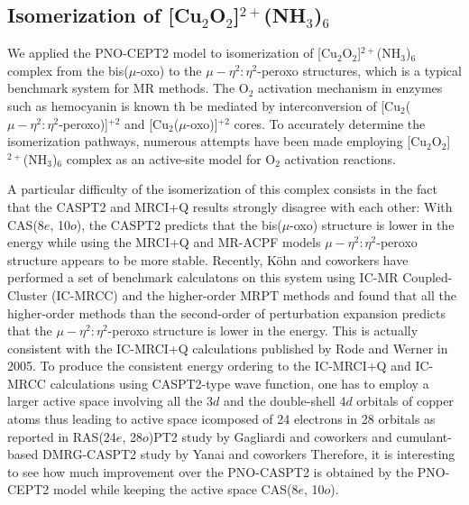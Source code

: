 \documentclass[aip,jcp,amsmath,twocolumn,floatfix,reprint,fleqn]{revtex4-1}
\begin{document}
\subsection{Isomerization of [Cu${}_2$O${}_2$]${}^{2+}$(NH${}_3$)${}_{6}$}

%
We applied the PNO-CEPT2 model to isomerization of [Cu${}_2$O${}_2$]${}^{2+}$(NH${}_3$)${}_{6}$ complex from the bis($\mu$-oxo) to the $\mu-\eta^2:\eta^2$-peroxo structures, which is a typical benchmark system for MR methods.\cite{Rode2005,AK74,doi:10.1063/1.4900878}
%
The O${}_2$ activation mechanism in enzymes such as hemocyanin is known th be mediated by interconversion of [Cu${}_2$($\mu-\eta^2:\eta^2$-peroxo)]${}^{+2}$ and [Cu${}_2$($\mu$-oxo)]${}^{+2}$ cores.
%
To accurately determine the isomerization pathways, numerous attempts have been made employing [Cu${}_2$O${}_2$]${}^{2+}$(NH${}_3$)${}_{6}$ complex as an active-site model for O${}_2$ activation reactions.

%
A particular difficulty of the isomerization of this complex consists in the fact that the CASPT2 and MRCI+Q results strongly disagree with each other: With CAS(8$e$, 10$o$), the CASPT2 predicts that the bis($\mu$-oxo) structure is lower in the energy while using the MRCI+Q and MR-ACPF models $\mu-\eta^2:\eta^2$-peroxo structure appears to be more stable.
%
Recently, K\"ohn and coworkers\cite{AK74} have performed a set of benchmark calculatons on this system using IC-MR Coupled-Cluster (IC-MRCC)\cite{MHandKoehn2011,hanauercommunication:2012} and the higher-order MRPT methods and found that all the higher-order methods than the second-order of perturbation expansion predicts that the $\mu-\eta^2:\eta^2$-peroxo structure is lower in the energy.
%
This is actually consistent with the IC-MRCI+Q calculations published by Rode and Werner in 2005.\cite{Rode2005}
%
To produce the consistent energy ordering to the IC-MRCI+Q and IC-MRCC calculations using CASPT2-type wave function, one has to employ a larger active space involving all the 3$d$ and the double-shell 4$d$ orbitals of copper atoms thus leading to active space icomposed of 24 electrons in 28 orbitals as reported in RAS(24$e$, 28$o$)PT2 study by Gagliardi and coworkers\cite{doi:10.1021/jp056791e} and cumulant-based DMRG-CASPT2 study by Yanai and coworkers\cite{doi:10.1063/1.4900878}
%
Therefore, it is interesting to see how much improvement over the PNO-CASPT2 is obtained by the PNO-CEPT2 model while keeping the active space CAS(8$e$, 10$o$).
\end{document}
